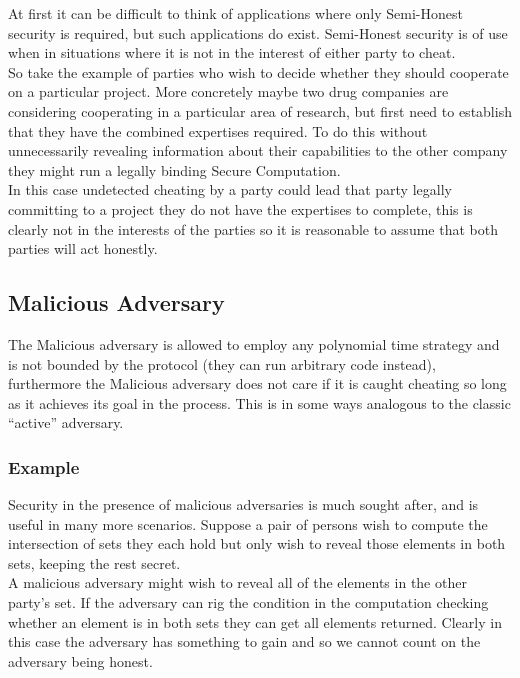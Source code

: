 \documentclass[ %
                    author={Nicholas Tutte},
                supervisor={Prof. Nigel Smart},
                    degree={MEng},
                     title={Secure Two Party Computation},
                  subtitle={A practical comparison of recent protocols},
                      type={Research - GG1K},
                      year={2015} ]{dissertation}
\begin{document}
					At first it can be difficult to think of applications where only Semi-Honest security is required, but such applications do exist. Semi-Honest security is of use when in situations where it is not in the interest of either party to cheat.\\

					So take the example of parties who wish to decide whether they should cooperate on a particular project. More concretely maybe two drug companies are considering cooperating in a particular area of research, but first need to establish that they have the combined expertises required. To do this without unnecessarily revealing information about their capabilities to the other company they might run a legally binding Secure Computation.\\
					
					In this case undetected cheating by a party could lead that party legally committing to a project they do not have the expertises to complete, this is clearly not in the interests of the parties so it is reasonable to assume that both parties will act honestly.


			\subsection{Malicious Adversary}
				The Malicious adversary is allowed to employ any polynomial time strategy and is not bounded by the protocol (they can run arbitrary code instead), furthermore the Malicious adversary does not care if it is caught cheating so long as it achieves its goal in the process. This is in some ways analogous to the classic ``active'' adversary.

				\subsubsection{Example}
					Security in the presence of malicious adversaries is much sought after, and is useful in many more scenarios. Suppose a pair of persons wish to compute the intersection of sets they each hold but only wish to reveal those elements in both sets, keeping the rest secret.\\

					A malicious adversary might wish to reveal all of the elements in the other party's set. If the adversary can rig the condition in the computation checking whether an element is in both sets they can get all elements returned. Clearly in this case the adversary has something to gain and so we cannot count on the adversary being honest.
\end{document}
